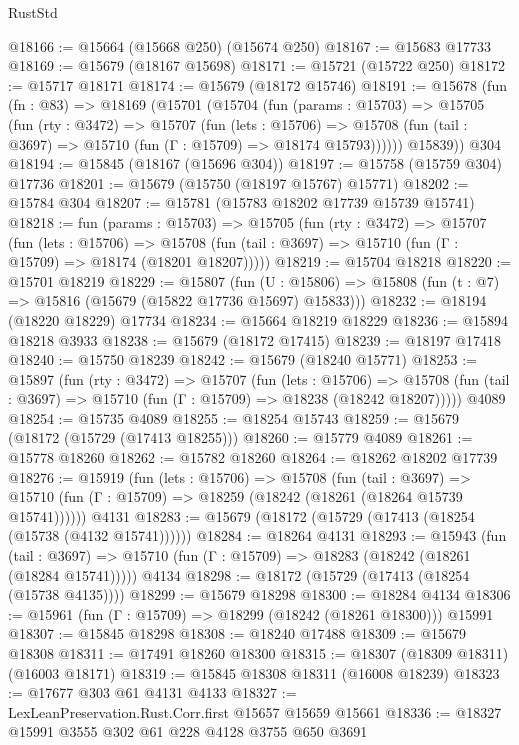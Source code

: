 \begin{lexlean}{RustStd}
\begin{coremodule}
@18166 := @15664 (@15668 @250) (@15674 @250)
@18167 := @15683 @17733
@18169 := @15679 (@18167 @15698)
@18171 := @15721 (@15722 @250)
@18172 := @15717 @18171
@18174 := @15679 (@18172 @15746)
@18191 := @15678
    (fun (fn : @83) =>
    @18169
      (@15701
        (@15704
          (fun (params : @15703) =>
          @15705
            (fun (rty : @3472) =>
            @15707
              (fun (lets : @15706) =>
              @15708 (fun (tail : @3697) => @15710 (fun (Γ : @15709) => @18174 @15793))))))
        @15839))
    @304
@18194 := @15845 (@18167 (@15696 @304))
@18197 := @15758 (@15759 @304) @17736
@18201 := @15679 (@15750 (@18197 @15767) @15771)
@18202 := @15784 @304
@18207 := @15781 (@15783 @18202 @17739 @15739 @15741)
@18218 := fun (params : @15703) =>
  @15705
    (fun (rty : @3472) =>
    @15707
      (fun (lets : @15706) =>
      @15708 (fun (tail : @3697) => @15710 (fun (Γ : @15709) => @18174 (@18201 @18207)))))
@18219 := @15704 @18218
@18220 := @15701 @18219
@18229 := @15807
    (fun (U : @15806) => @15808 (fun (t : @7) => @15816 (@15679 (@15822 @17736 @15697) @15833)))
@18232 := @18194 (@18220 @18229) @17734
@18234 := @15664 @18219 @18229
@18236 := @15894 @18218 @3933
@18238 := @15679 (@18172 @17415)
@18239 := @18197 @17418
@18240 := @15750 @18239
@18242 := @15679 (@18240 @15771)
@18253 := @15897
    (fun (rty : @3472) =>
    @15707
      (fun (lets : @15706) =>
      @15708 (fun (tail : @3697) => @15710 (fun (Γ : @15709) => @18238 (@18242 @18207)))))
    @4089
@18254 := @15735 @4089
@18255 := @18254 @15743
@18259 := @15679 (@18172 (@15729 (@17413 @18255)))
@18260 := @15779 @4089
@18261 := @15778 @18260
@18262 := @15782 @18260
@18264 := @18262 @18202 @17739
@18276 := @15919
    (fun (lets : @15706) =>
    @15708
      (fun (tail : @3697) =>
      @15710 (fun (Γ : @15709) => @18259 (@18242 (@18261 (@18264 @15739 @15741))))))
    @4131
@18283 := @15679 (@18172 (@15729 (@17413 (@18254 (@15738 (@4132 @15741))))))
@18284 := @18264 @4131
@18293 := @15943
    (fun (tail : @3697) => @15710 (fun (Γ : @15709) => @18283 (@18242 (@18261 (@18284 @15741)))))
    @4134
@18298 := @18172 (@15729 (@17413 (@18254 (@15738 @4135))))
@18299 := @15679 @18298
@18300 := @18284 @4134
@18306 := @15961 (fun (Γ : @15709) => @18299 (@18242 (@18261 @18300))) @15991
@18307 := @15845 @18298
@18308 := @18240 @17488
@18309 := @15679 @18308
@18311 := @17491 @18260 @18300
@18315 := @18307 (@18309 @18311) (@16003 @18171)
@18319 := @15845 @18308 @18311 (@16008 @18239)
@18323 := @17677 @303 @61 @4131 @4133
@18327 := LexLeanPreservation.Rust.Corr.first @15657 @15659 @15661
@18336 := @18327 @15991 @3555 @302 @61 @228 @4128 @3755 @650 @3691

\end{coremodule}
\end{lexlean}
